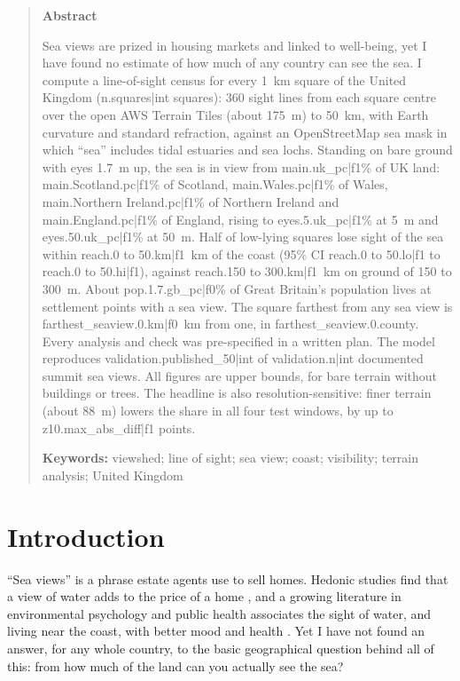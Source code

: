 \begin{quote}
\small
\begin{center}\textbf{Abstract}\end{center}
Sea views are prized in housing markets and linked to well-being, yet I have found no estimate of how much of any country can see the sea. I compute a line-of-sight census for every 1~km square of the United Kingdom ({{n.squares|int}} squares): 360 sight lines from each square centre over the open AWS Terrain Tiles (about 175~m) to 50~km, with Earth curvature and standard refraction, against an OpenStreetMap sea mask in which ``sea'' includes tidal estuaries and sea lochs. Standing on bare ground with eyes 1.7~m up, the sea is in view from {{main.uk_pc|f1}}\% of UK land: {{main.Scotland.pc|f1}}\% of Scotland, {{main.Wales.pc|f1}}\% of Wales, {{main.Northern Ireland.pc|f1}}\% of Northern Ireland and {{main.England.pc|f1}}\% of England, rising to {{eyes.5.uk_pc|f1}}\% at 5~m and {{eyes.50.uk_pc|f1}}\% at 50~m. Half of low-lying squares lose sight of the sea within {{reach.0 to 50.km|f1}}~km of the coast (95\% CI {{reach.0 to 50.lo|f1}} to {{reach.0 to 50.hi|f1}}), against {{reach.150 to 300.km|f1}}~km on ground of 150 to 300~m. About {{pop.1.7.gb_pc|f0}}\% of Great Britain's population lives at settlement points with a sea view. The square farthest from any sea view is {{farthest_seaview.0.km|f0}}~km from one, in {{farthest_seaview.0.county}}. Every analysis and check was pre-specified in a written plan. The model reproduces {{validation.published_50|int}} of {{validation.n|int}} documented summit sea views. All figures are upper bounds, for bare terrain without buildings or trees. The headline is also resolution-sensitive: finer terrain (about 88~m) lowers the share in all four test windows, by up to {{z10.max_abs_diff|f1}} points.

\textbf{Keywords:} viewshed; line of sight; sea view; coast; visibility; terrain analysis; United Kingdom
\end{quote}

\section{Introduction}
``Sea views'' is a phrase estate agents use to sell homes. Hedonic studies find that a view of water adds to the price of a home \citep{benson1998,bourassa2004,jim2009}, and a growing literature in environmental psychology and public health associates the sight of water, and living near the coast, with better mood and health \citep{white2010,wheeler2012,nutsford2016,gascon2017}. Yet I have not found an answer, for any whole country, to the basic geographical question behind all of this: from how much of the land can you actually see the sea?

